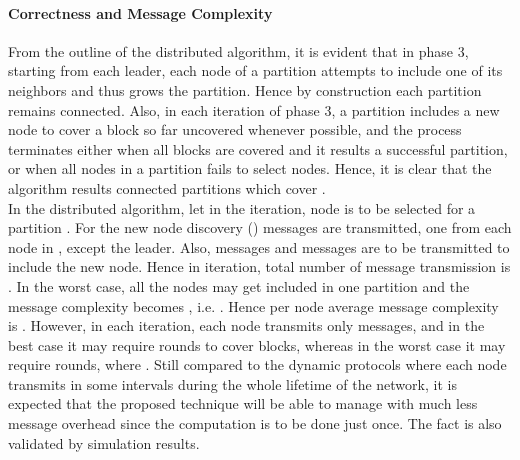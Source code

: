 \documentclass{acm_proc_article-sp}
\begin{document}
\paragraph{\bf Correctness and Message Complexity} From the outline of the distributed algorithm, it is evident that in phase 3, starting from each leader, each node of a partition attempts to include one of its neighbors and thus grows the partition. Hence by construction each partition remains connected. Also, in each iteration of phase 3, a partition includes a new node to cover a block so far uncovered whenever possible, and the process terminates either when all blocks are covered and it results a successful partition, or when all nodes in a partition fails to select nodes. Hence, it is clear that the algorithm results connected partitions which cover .\\
In the distributed algorithm, let in the  iteration,  node is to be selected for a partition .
For the new node discovery ()  messages are transmitted, one from each node in , except the leader. Also,   messages and   messages are to be transmitted to include the new node. Hence in  iteration, total number of message transmission is .
In the worst case, all the nodes may get included in one partition and the message complexity becomes , i.e. . Hence per node average message complexity is . However, in each iteration, each node transmits only  messages, and in the best case it may require  rounds to cover  blocks, whereas in the worst case it may require  rounds, where . Still compared to the dynamic protocols where each node transmits in some intervals during the whole lifetime of the network, it is expected that the proposed technique will be able to manage with much less message overhead since the computation is to be done just once. The fact is also validated by simulation results.
\end{document}
